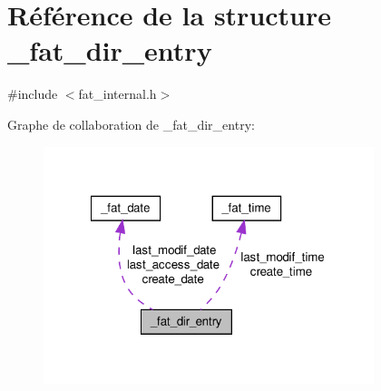 \hypertarget{struct__fat__dir__entry}{\section{Référence de la structure \-\_\-fat\-\_\-dir\-\_\-entry}
\label{struct__fat__dir__entry}
}


{\ttfamily \#include $<$fat\-\_\-internal.\-h$>$}



Graphe de collaboration de \-\_\-fat\-\_\-dir\-\_\-entry\-:\nopagebreak
\begin{figure}[H]
\begin{center}
\leavevmode
\includegraphics[width=273pt]{struct__fat__dir__entry__coll__graph}
\end{center}
\end{figure}
